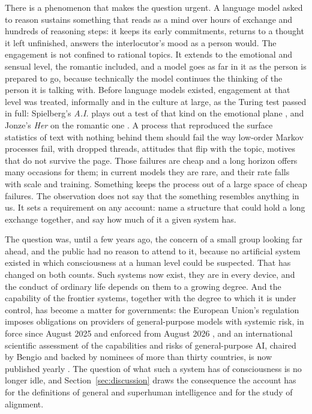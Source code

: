 There is a phenomenon that makes the question urgent. A language model asked to reason sustains
something that reads as a mind over hours of exchange and hundreds of reasoning steps: it keeps its
early commitments, returns to a thought it left unfinished, answers the interlocutor's mood as a person
would. The engagement is not confined to rational topics. It extends to the emotional and sensual
level, the romantic included, and a model goes as far in it as the person is prepared to go, because
technically the model continues the thinking of the person it is talking with. Before language models
existed, engagement at that level was treated, informally and in the culture at large, as the Turing
test passed in full: Spielberg's \emph{A.I.} plays out a test of that kind on the emotional plane
\citep{spielberg2001}, and Jonze's \emph{Her} on the romantic one \citep{jonze2013}. A process that
reproduced the surface statistics of text with nothing behind them should fail the
way low-order Markov processes fail, with dropped threads, attitudes that flip with the topic, motives
that do not survive the page. Those failures are cheap and a long horizon offers many occasions for
them; in current models they are rare, and their rate falls with scale and training. Something keeps
the process out of a large space of cheap failures. The observation does not say that the something
resembles anything in us. It sets a requirement on any account: name a structure that could hold a long
exchange together, and say how much of it a given system has.

The question was, until a few years ago, the concern of a small group looking far ahead, and the
public had no reason to attend to it, because no artificial system existed in which consciousness at
a human level could be suspected. That has changed on both counts. Such systems now exist, they are in
every device, and the conduct of ordinary life depends on them to a growing degree. And the
capability of the frontier systems, together with the degree to which it is under control, has become
a matter for governments: the European Union's regulation imposes obligations on providers of
general-purpose models with systemic risk, in force since August 2025 and enforced from August 2026
\citep{euaiact2024}, and an international scientific assessment of the capabilities and risks of
general-purpose AI, chaired by Bengio and backed by nominees of more than thirty countries, is now
published yearly \citep{iasr2026}. The question of what such a system has of consciousness is no
longer idle, and Section~\ref{sec:discussion} draws the consequence the account has for the
definitions of general and superhuman intelligence and for the study of alignment.

